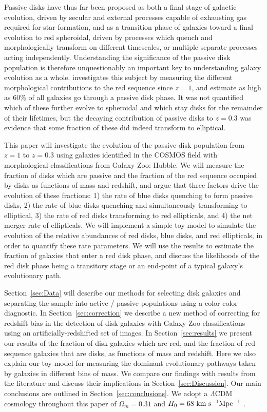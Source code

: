 \documentclass[useAMS,usenatbib]{mn2e}
\begin{document}
Passive disks have thus far been proposed as both a final stage of galactic evolution, driven by secular and external processes capable of exhausting gas required for star-formation, and as a transition phase of galaxies toward a final evolution to red spheroidal, driven by processes which quench and morphologically transform on different timescales, or multiple separate processes acting independently. Understanding the significance of the passive disk population is therefore unquestionably an important key to understanding galaxy evolution as a whole. \citet{Bundy2010} investigates this subject by measuring the different morphological contributions to the red sequence since $z=1$, and estimate as high as 60\% of all galaxies go through a passive disk phase. It was not quantified which of these further evolve to spheroidal and which stay disks for the remainder of their lifetimes, but the decaying contribution of passive disks to $z=0.3$ was evidence that some fraction of these did indeed transform to elliptical.

This paper will investigate the evolution of the passive disk population from $z=1$ to $z=0.3$ using galaxies identified in the COSMOS field with morphological classifications from Galaxy Zoo: Hubble. We will measure the fraction of disks which are passive and the fraction of the red sequence occupied by disks as functions of mass and redshift, and argue that three factors drive the evolution of these fractions: 1) the rate of blue disks quenching to form passive disks, 2) the rate of blue disks quenching and simultaneously transforming to elliptical, 3) the rate of red disks transforming to red ellipticals, and 4) the net merger rate of ellipticals. We will implement a simple toy model to simulate the evolution of the relative abundances of red disks, blue disks, and red ellipticals, in order to quantify these rate parameters. We will use the results to estimate the fraction of galaxies that enter a red disk phase, and discuss the likelihoods of the red disk phase being a transitory stage or an end-point of a typical galaxy's evolutionary path.

Section~\ref{sec:Data} will describe our methods for selecting disk galaxies and separating the sample into active / passive populations using a color-color diagnostic. In Section~\ref{sec:correction} we describe a new method of correcting for redshift bias in the detection of disk galaxies with Galaxy Zoo classifications using an artificially-redshifted set of images. In Section~\ref{sec:results} we present our results of the fraction of disk galaxies which are red, and the fraction of red sequence galaxies that are disks, as functions of mass and redshift. Here we also explain our toy-model for measuring the dominant evolutionary pathways taken by galaxies in different bins of mass. We compare our findings with results from the literature and discuss their implications in Section~\ref{sec:Discussion}. Our main conclusions are outlined in Section~\ref{sec:conclusions}. We adopt a $\Lambda$CDM cosmology throughout this paper of $\Omega_m=0.31$ and $H_0=68~\rm km~s^{-1} Mpc^{-1}$ \citep{PlanckCollaboration2015}.
\end{document}
